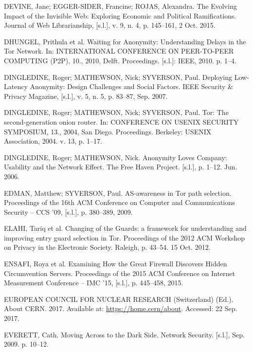 \begin{list}{}{\setlength{\leftmargin}{0pt}\setlength{\itemsep}{6pt}\setlength{\parsep}{0pt}}
\item DEVINE, Jane; EGGER-SIDER, Francine; ROJAS, Alexandra. The Evolving Impact of the Invisible Web: Exploring Economic and Political Ramifications. Journal of Web Librarianship, [s.l.], v. 9, n. 4, p. 145--161, 2 Oct. 2015.

\item DHUNGEL, Prithula et al. Waiting for Anonymity: Understanding Delays in the Tor Network. In: INTERNATIONAL CONFERENCE ON PEER-TO-PEER COMPUTING (P2P), 10., 2010, Delft. Proceedings. [s.l.]: IEEE, 2010. p. 1--4.

\item DINGLEDINE, Roger; MATHEWSON, Nick; SYVERSON, Paul. Deploying Low-Latency Anonymity: Design Challenges and Social Factors. IEEE Security \& Privacy Magazine, [s.l.], v. 5, n. 5, p. 83--87, Sep. 2007.

\item DINGLEDINE, Roger; MATHEWSON, Nick; SYVERSON, Paul. Tor: The second-generation onion router. In: CONFERENCE ON USENIX SECURITY SYMPOSIUM, 13., 2004, San Diego. Proceedings. Berkeley: USENIX Association, 2004. v. 13, p. 1--17.

\item DINGLEDINE, Roger; MATHEWSON, Nick. Anonymity Loves Company: Usability and the Network Effect. The Free Haven Project. [s.l.], p. 1--12. Jun. 2006.

\item EDMAN, Matthew; SYVERSON, Paul. AS-awareness in Tor path selection. Proceedings of the 16th ACM Conference on Computer and Communications Security -- CCS '09, [s.l.], p. 380--389, 2009.

\item ELAHI, Tariq et al. Changing of the Guards: a framework for understanding and improving entry guard selection in Tor. Proceedings of the 2012 ACM Workshop on Privacy in the Electronic Society. Raleigh, p. 43--54. 15 Oct. 2012.

\item ENSAFI, Roya et al. Examining How the Great Firewall Discovers Hidden Circumvention Servers. Proceedings of the 2015 ACM Conference on Internet Measurement Conference -- IMC '15, [s.l.], p. 445--458, 2015.

\item EUROPEAN COUNCIL FOR NUCLEAR RESEARCH (Switzerland) (Ed.). About CERN. 2017. Available at: \url{https://home.cern/about}. Accessed: 22 Sep. 2017.

\item EVERETT, Cath. Moving Across to the Dark Side. Network Security. [s.l.], Sep. 2009. p. 10--12.


\end{list}

